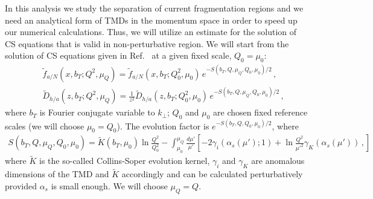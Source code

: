 \documentclass[final,3p,times,onecolumn,sort&compress,hidelinks]{elsarticle}
\newcommand\3[1]{\boldsymbol{#1}}
\begin{document}
In this analysis we study the separation of current  fragmentation regions and we need an analytical form of TMDs in the momentum space in order to speed up our numerical calculations.
Thus, we will utilize an estimate for the solution of CS equations that is valid in non-perturbative region. We will start from the solution of CS equations given in Ref.~\cite{Collins:2014jpa} at a given fixed scale, $Q_0=\mu_0$:
\begin{eqnarray}
&&\tilde f_{a/N} (x,b_T; Q^2, \mu_Q)= \tilde f_{a/N} (x, b_T; Q_0^2, \mu_0)\,e^{-S(b_T, Q, \mu_Q, Q_0, \mu_0)/2}\,,
\label{e:PDF_ansatz}\\[0.3cm]
&&\tilde D_{h/a}(z,b_T; Q^2, \mu_Q)=\frac{1}{z^2}\tilde D_{h/a}(z, b_T; Q_0^2, \mu_0)\,e^{-S(b_T, Q, \mu_Q, Q_0, \mu_0)/2}\,,
\label{e:FF_ansatz0}
\end{eqnarray}
where $b_T$ is Fourier conjugate variable to $k_\perp$; $Q_0$ and $\mu_0$ are chosen fixed reference scales (we will choose $\mu_0 = Q_0$). The evolution factor is $e^{-S(b_T, Q, Q_0, \mu_0)/2}$, where
\begin{eqnarray}
S(b_T, Q, \mu_Q, Q_0, \mu_0) = \tilde K(b_T,\mu_0) \ln\frac{Q^2}{Q_0^2} - \int_{\mu_0}^{\mu_Q} \frac{d \mu'}{\mu'}\left[
-2 \gamma_i(\alpha_s(\mu');1) +\ln\frac{Q^2}{\mu'^2}\gamma_K(\alpha_s(\mu'))\,,
 \right]
 \label{e:FF_ansatz}
\end{eqnarray}
where $\tilde K$ is the so-called Collins-Soper evolution kernel, $\gamma_i$ and $\gamma_K$ are anomalous dimensions of the TMD and $\tilde K$ accordingly and can be calculated perturbatively provided $\alpha_s$ is small enough. We will choose $\mu_Q = Q$. 
\end{document}
